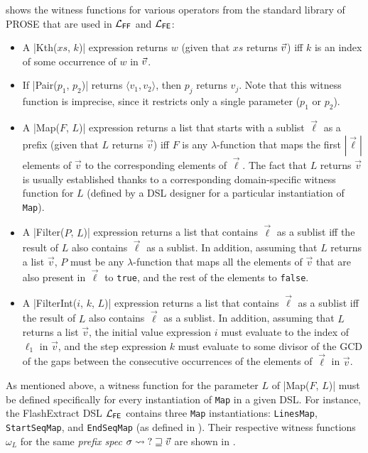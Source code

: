 \begin{example}
     shows the witness functions for various operators from the standard library of PROSE that are
    used in $\mathcal{L}_{\mathsf{FF}}$ and $\mathcal{L}_{\mathsf{FE}}$:
    \begin{itemize}[nosep]
        \item A \dslinline|Kth($xs$, $k$)| expression returns $w$ (given that $xs$ returns $\vec{v}$) iff $k$ is an
            index of some occurrence of $w$ in $\vec{v}$.
        \item If \dslinline|Pair($p_1$, $p_2$)| returns $\langle v_1, v_2\rangle$, then $p_j$ returns $v_j$.
            Note that this witness function is imprecise, since it restricts only a single parameter ($p_1$ or $p_2$).
        \item A \dslinline|Map($F$, $L$)| expression returns a list that starts with a sublist $\vec{\ell}$ as a prefix
            (given that $L$ returns $\vec{v}$) iff $F$ is any $\lambda$-function that maps the first $|\vec{\ell}|$
            elements of $\vec{v}$ to the corresponding elements of $\vec{\ell}$.
            The fact that $L$ returns $\vec{v}$ is usually established thanks to a corresponding domain-specific witness
            function for $L$ (defined by a DSL designer for a particular instantiation of \texttt{Map}).
        \item A \dslinline|Filter($P$, $L$)| expression returns a list that contains $\vec{\ell}$ as a sublist iff the
            result of $L$ also contains $\vec{\ell}$ as a sublist.
            In addition, assuming that $L$ returns a list $\vec{v}$, $P$ must be any $\lambda$-function that maps all
            the elements of $\vec{v}$ that are also present in $\vec{\ell}$ to \texttt{true}, and the rest of the
            elements to \texttt{false}.
        \item A \dslinline|FilterInt($i$, $k$, $L$)| expression returns a list that contains $\vec{\ell}$ as a sublist
            iff the result of $L$ also contains $\vec{\ell}$ as a sublist.
            In addition, assuming that $L$ returns a list $\vec{v}$, the initial value expression $i$ must evaluate to
            the index of $\ell_1$ in $\vec{v}$, and the step expression $k$ must evaluate to some divisor of the GCD of
            the gaps between the consecutive occurrences of the elements of $\vec{\ell}$ in $\vec{v}$.
    \end{itemize}
\end{example}

\begin{example}
    As mentioned above, a witness function for the parameter $L$ of \dslinline|Map($F$, $L$)| must be defined
    specifically for every instantiation of \texttt{Map} in a given DSL.
    For instance, the FlashExtract DSL $\mathcal{L}_{\mathsf{FE}}$ contains three \texttt{Map} instantiations: \texttt{LinesMap},
    \texttt{StartSeqMap}, and \texttt{EndSeqMap} (as defined in ).
    Their respective witness functions $\omega_L$ for the same \emph{prefix spec} $\sigma \rightsquigarrow \mathbf{?} \sqsupseteq
    \vec{v}$ are shown in .
\end{example}


